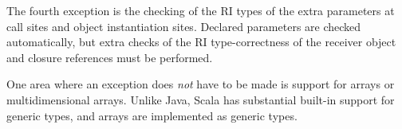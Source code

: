 \documentclass[letterpaper,11pt]{article}
\theoremstyle{definition}
\theoremstyle{remark}
\begin{document}
The fourth exception is the checking of the RI types of the extra parameters at call sites and
object instantiation sites. Declared parameters are checked automatically,
but extra checks of the RI type-correctness of the receiver object and closure references
must be performed.

One area where an exception does \emph{not} have to be made is support for arrays or
multidimensional arrays.
Unlike Java, Scala has substantial built-in support for generic types,
and arrays are implemented as generic types.


\begin{comment}
\subsubsection{Pluggable Type Systems}


One open question is how a general plug-in interface
for a type inference/checking system should work.
My experience, however, leads me to believe that attempting to implement
a general interface or framework without several well-motivated concrete
examples of expected usage generally leads to poor design and engineering decisions.
Therefore, I plan to implement the reference immutability system as a fork
of the Scala compiler, which is the fastest way to develop the system in the short term.
I expect that this work will yield some observations
that will help answer the question of what kinds of features a pluggable type-system
interface should expose,
but I leave the implementation of such an interface for future work.
\end{comment}



%

\end{document}
